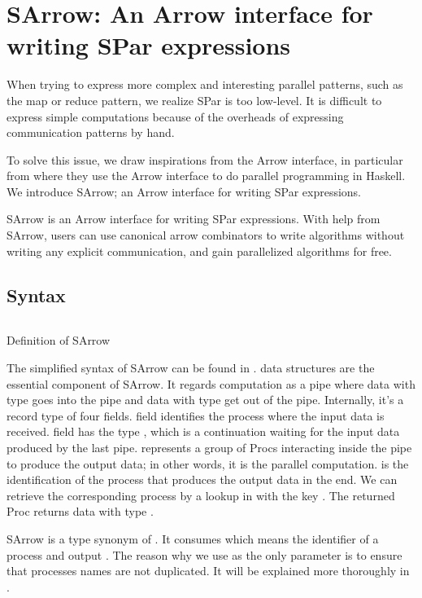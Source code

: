 \chapter{SArrow: An Arrow interface for writing SPar expressions} \label{chap:arrow}
When trying to express more complex and interesting parallel patterns, such as the map or reduce pattern, we realize SPar is too low-level. It is difficult to express simple computations because of the overheads of expressing communication patterns by hand. 

To solve this issue, we draw inspirations from the Arrow interface, in particular from \cite{braunArrowsParallelComputation2018} where they use the Arrow interface to do parallel programming in Haskell. We introduce SArrow; an Arrow interface for writing SPar expressions.

SArrow is an Arrow interface for writing SPar expressions. With help from SArrow, users can use canonical arrow combinators to write algorithms without writing any explicit communication, and gain parallelized algorithms for free.

\section{Syntax}
\begin{listing}[ht]
\inputminted{Haskell}{arrow/def.hs} 
\caption{Definition of SArrow}
\label{SArrow:def}
\end{listing}
The simplified syntax of SArrow can be found in .  data structures are the essential component of SArrow. It regards computation as a pipe where data with type  goes into the pipe and data with type  get out of the pipe. Internally, it's a record type of four fields.  field identifies the process where the input data is received.  field has the type , which is a continuation waiting for the input data produced by the last pipe.  represents a group of Procs interacting inside the pipe to produce the output data; in other words, it is the parallel computation.  is the identification of the process that produces the output data in the end. We can retrieve the corresponding process by a lookup in  with the key . The returned Proc returns data with type . 

SArrow is a type synonym of . It consumes  which means the identifier of a process and output . The reason why we use  as the only parameter is to ensure that processes names are not duplicated. It will be explained more thoroughly in .
